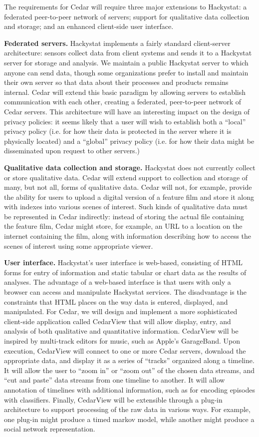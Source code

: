 The requirements for Cedar will require three major extensions to
Hackystat: a federated peer-to-peer network of servers; support for
qualitative data collection and storage; and an enhanced client-side user
interface.

{\bf Federated servers.}  Hackystat implements a fairly standard
client-server architecture: sensors collect data from client systems and
sends it to a Hackystat server for storage and analysis.  We maintain a
public Hackystat server to which anyone can send data, though some
organizations prefer to install and maintain their own server so that data
about their processes and products remains internal.  Cedar
will extend this basic paradigm by allowing servers to establish
communication with each other, creating a federated, peer-to-peer network
of Cedar servers. This architecture will have an interesting impact on the
design of privacy policies: it seems likely that a user will wish to
establish both a ``local'' privacy policy (i.e. for how their data is
protected in the server where it is physically located) and a ``global''
privacy policy (i.e. for how their data might be disseminated upon request
to other servers.)

{\bf Qualitative data collection and storage.} Hackystat does not currently
collect or store qualitative data.  Cedar will extend support to collection
and storage of many, but not all, forms of qualitative data.  Cedar will
not, for example, provide the ability for users to upload a digital version
of a feature film and store it along with indexes into various scenes of
interest.  Such kinds of qualitative data must be represented in Cedar
indirectly: instead of storing the actual file containing the feature film,
Cedar might store, for example, an URL to a location on the internet
containing the film, along with information describing how to access the
scenes of interest using some appropriate viewer.

{\bf User interface.} Hackystat's user interface is web-based, consisting
of HTML forms for entry of information and static tabular or chart data as
the results of analyses.  The advantage of a web-based interface is that
users with only a browser can access and manipulate Hackystat services.
The disadvantage is the constraints that HTML places on the way data is
entered, displayed, and manipulated.  For Cedar, we will design and
implement a more sophisticated client-side application called CedarView
that will allow display, entry, and analysis of both qualitative and
quantitative information.  CedarView will be inspired by multi-track
editors for music, such as Apple's GarageBand.  Upon execution, CedarView
will connect to one or more Cedar servers, download the appropriate data,
and display it as a series of ``tracks'' organized along a timeline.  It
will allow the user to ``zoom in'' or ``zoom out'' of the chosen data
streams, and ``cut and paste'' data streams from one timeline to
another. It will allow annotation of timelines with additional information,
such as for encoding episodes with classifiers. Finally, CedarView will be
extensible through a plug-in architecture to support processing of the raw
data in various ways.  For example, one plug-in might produce a timed
markov model, while another might produce a social network representation.

